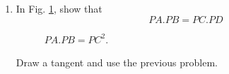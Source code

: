 \begin{enumerate}[label=\arabic*.,ref=\thesubsection.\theenumi]
%
\item
	In Fig. \ref{ch4_chord_tangent_prod}, show that\begin{equation}
	PA.PB = PC.PD
	\end{equation}

%
\begin{figure}[!ht]
	\begin{center}
		
		\resizebox{\columnwidth}{!}{}
	\end{center}
	\caption{$PA.PB = PC^2$.}
	\label{ch4_chord_tangent_prod}	
\end{figure}

\solution Draw a tangent and use the previous problem.
\end{enumerate}
